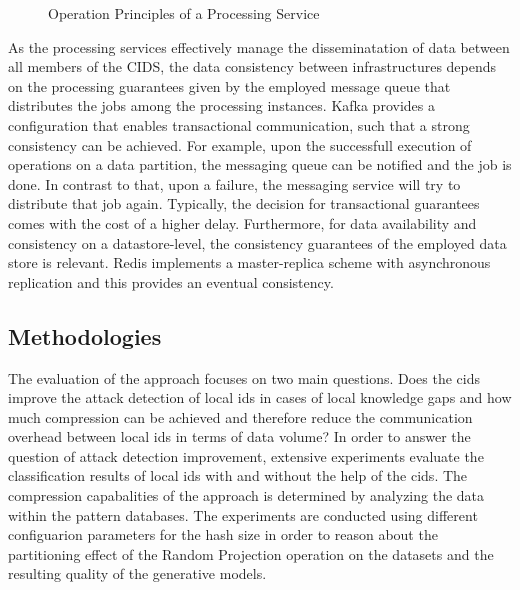 \documentclass[../../main.tex]{subfiles}
\begin{document}
\begin{figure}[b!]
    \centering
    
    \caption[Implementation Details]{Operation Principles of a Processing Service}  \label{fig:implementation}
 \end{figure}

As the processing services effectively manage the disseminatation of data between all members of the CIDS, the data consistency between infrastructures depends on the processing guarantees given by the employed message queue that distributes the jobs among the processing instances. Kafka provides a configuration that enables transactional communication, such that a strong consistency can be achieved. For example, upon the successfull execution of operations on a data partition, the messaging queue can be notified and the job is done. In contrast to that, upon a failure, the messaging service will try to distribute that job again. Typically, the decision for transactional guarantees comes with the cost of a higher delay. Furthermore, for data availability and consistency on a datastore-level, the consistency guarantees of the employed data store is relevant. Redis implements a master-replica scheme with asynchronous replication and this provides an eventual consistency.

\subsection{Methodologies}\label{subsec:methodologies}

The evaluation of the approach focuses on two main questions. Does the \gls{cids} improve the attack detection of local \gls{ids} in cases of local knowledge gaps and how much compression can be achieved and therefore reduce the communication overhead between local \gls{ids} in terms of data volume? In order to answer the question of attack detection improvement, extensive experiments evaluate the classification results of local \gls{ids} with and without the help of the \gls{cids}. The compression capabalities of the approach is determined by analyzing the data within the pattern databases. The experiments are conducted using different configuarion parameters for the hash size in order to reason about the partitioning effect of the Random Projection operation on the datasets and the resulting quality of the generative models.
\end{document}
